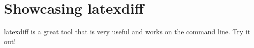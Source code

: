 \documentclass[12pt]{article}
\begin{document}
\section{Showcasing latexdiff}

latexdiff is a great tool that is very useful and works on the command line. Try it out!
\end{document}
